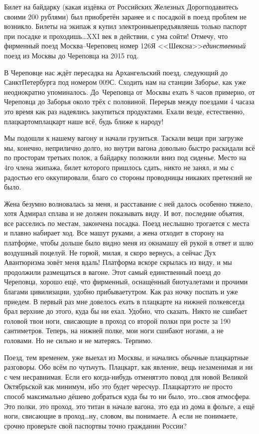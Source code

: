Билет на байдарку (какая издёвка от Российских Железных Дорог\mdash подавитесь своими 200 рублями) был приобретён заранее и с посадкой в поезд проблем не возникло. Билеты на экипаж я купил электронные\mdash предъявляешь только паспорт при посадке и проходишь\ldots XXI век в действии, с ума сойти! Отмечу, что фирменный поезд Москва\nobreakdash--Череповец номер 126Я <<Шексна>>\mdash \textit{единственный} поезд из Москвы до Череповца на 2015 год. 
 
В Череповце нас ждёт пересадка на Архангельский поезд, следующий до Санкт\sdash Петербурга под номером 009С. Сходить нам на станции Заборье, как уже неоднократно упоминалось. До~Череповца от~Москвы ехать 8 часов примерно, от Череповца до Заборья около трёх с половиной. Перерыв между поездами 4 часа\mdash за это время как раз надеялись закупиться продуктами. Ехали везде, естественно, плацкартом\mdash плацкарт наше всё, будь ближе к народу! 

Мы подошли к нашему вагону и начали грузиться. Таскали вещи при загрузке мы, конечно, неприлично долго, но внутри вагона довольно быстро раскидали всё по просторам третьих полок, а байдарку положили вниз под сиденье. Место на 4\sdash го члена экипажа, билет которого пришлось сдать, никто не занял, и мы с радостью его оккупировали, благо со стороны проводницы никаких претензий не было.

Жена безумно волновалась за меня, и расставание с ней далось особенно тяжело, хотя Адмирал сплава и не должен показывать виду. И вот, последние объятия, все расселись по местам, закончена посадка. Поезд неслышно трогается с места и плавно набирает ход. Все машут руками, а жена отходит в сторону на платформе, чтобы дольше было видно меня из окна\mdash машу ей рукой в ответ и шлю воздушный поцелуй. Не горюй, милая, я скоро вернусь, а сейчас Дух Авантюризма зовёт меня вдаль!
\newpage
Платформа вскоре скрылась из виду, и мы продолжили размещаться в вагоне. Этот самый единственный поезд до Череповца, хорошо ещё, что фирменный, оснащённый биотуалетами и прочими благами цивилизации, удобно прибывает\mdash утром. Как раз ночку поспать и уже приедем. В первый раз мне довелось ехать в плацкарте на нижней полке\mdash всегда брал верхние до этого, куда бы ни ехал. Удобно, что сказать. Никто не сшибает головой твои ноги, свисающие в проход со второй полки при росте за 190 сантиметров. Теперь, на нижней полке, мои ноги сшибают ногами, а не головами. Но не сильно и не матерясь. Терпимо. 

Поезд, тем временем, уже выехал из Москвы, и начались обычные плацкартные разговоры.  Обо всём по чуть\sdash чуть. Плацкарт, как явление, вещь незаменимая и ни с чем несравнимая. Если его когда-нибудь отменят\mdash это повод для новой Великой Октябрьской как минимум, ибо это будет чересчур. Плацкарт\mdash это не просто способ максимально дёшево добраться куда бы то ни было, это\ldots своя атмосфера. Это полки, это проход, это титан в начале вагона, это еда из дома в фольге, а ещё ноги, свисающие в проход\ldots ну, словом, вы понимаете. А если не понимаете, срочно проверьте свой паспорт\mdash вы точно гражданин России? 

